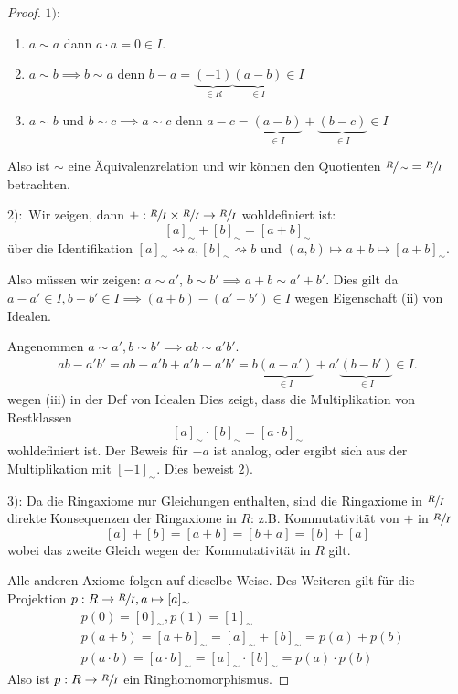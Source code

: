 \begin{proof}
	$1):$ \begin{enumerate}
		\item $a \sim a$ dann $a\cdot a = 0 \in I$.\\
		\item$a \sim b \implies b \sim a$ denn $b-a = \underbrace{(-1)}_{\in R}\underbrace{(a-b)}_{\in I} \in I$\\
		\item $a \sim b$ und $b \sim c \implies a \sim c$ denn $a-c = \underbrace{(a-b)}_{\in I} + \underbrace{(b-c)}_{\in I} \in I$
	\end{enumerate}
	Also ist $\sim$ eine Äquivalenzrelation und wir können den Quotienten $\sfrac{R}{\sim} = \sfrac{R}{I}$ betrachten.

	$2):$
	Wir zeigen, dann $+: \sfrac{R}{I} \times \sfrac{R}{I} \to \sfrac{R}{I}$ wohldefiniert ist:
	\[
		[ a ]_{\sim} + [ b ]_{\sim} = [ a+b ]_{\sim}
	\]
	über die Identifikation $[ a ]_{\sim} \rightsquigarrow a, [ b ]_{\sim} \rightsquigarrow b$ und $(a,b) \mapsto a+b \mapsto [ a+b ]_{\sim}$.

	Also müssen wir zeigen: $a \sim a'$, $b \sim b' \implies a+b \sim a' + b'$. Dies gilt da
	$a-a' \in I, b-b' \in I \implies (a+b) - (a'-b') \in I$ wegen Eigenschaft (ii) von Idealen. 

	Angenommen $a \sim a', b \sim b' \implies ab \sim a'b'$.
	\begin{align*}
		ab - a'b' = ab - a'b + a'b - a'b' = b \underbrace{(a-a')}_{\in I} + a'\underbrace{(b-b')}_{\in I} \in I
	.\end{align*}
	wegen (iii) in der Def von Idealen
	Dies zeigt, dass die Multiplikation von Restklassen
	\[
		[a]_{\sim} \cdot [b]_{\sim} = [a\cdot b]_{\sim}
	\] 
	wohldefiniert ist.
	Der Beweis für $-a$ ist analog, oder ergibt sich aus der Multiplikation mit $[-1]_{\sim}$.
	Dies beweist $2)$.

	$3)$: Da die Ringaxiome nur Gleichungen enthalten, sind die Ringaxiome in $\sfrac{R}{I}$ direkte Konsequenzen der Ringaxiome in $R$:
	z.B. Kommutativität von $+$ in $\sfrac{R}{I}$
	\[
		 [a] + [b] = [a+b] = [b+a] = [b] + [a]
	\] 
	wobei das zweite Gleich wegen der Kommutativität in $R$ gilt.

	Alle anderen Axiome folgen auf dieselbe Weise. 
	Des Weiteren gilt für die Projektion $p: R \to \sfrac{R}{I}, a \mapsto [a]_{\sim}$ 
	\begin{align*}
		&p(0) = [0]_{\sim}, p(1) = [1]_{\sim}\\
		&p(a+b) = [a+b]_{\sim} = [a]_{\sim} + [b]_{\sim} = p(a) + p(b)\\
		&p(a\cdot b) = [a\cdot b]_{\sim} = [a]_{\sim} \cdot [b]_{\sim} = p(a)\cdot p(b)
	\end{align*}
	Also ist $p: R \to \sfrac{R}{I}$ ein Ringhomomorphismus.
\end{proof}

